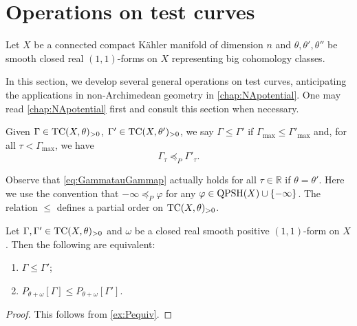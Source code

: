 \section{Operations on test curves}\label{sec:operationtc}
Let $X$ be a connected compact K\"ahler manifold of dimension $n$ and $\theta,\theta',\theta''$ be smooth closed real $(1,1)$-forms on $X$ representing big cohomology classes.

In this section, we develop several general operations on test curves, anticipating the applications in non-Archimedean geometry in \cref{chap:NApotential}. One may read \cref{chap:NApotential} first and consult this section when necessary.

\begin{definition}\label{def:potestcurve}
    Given $\Gamma\in \mathrm{TC}(X,\theta)_{>0}$, $\Gamma'\in \mathrm{TC}(X,\theta')_{>0}$, we say $\Gamma \leq \Gamma'$ if $\Gamma_{\max}\leq \Gamma'_{\max}$ and, for all $\tau<\Gamma_{\max}$, we have
    \begin{equation}\label{eq:GammatauGammap}
    \Gamma_{\tau}\preceq_P \Gamma'_{\tau}.
    \end{equation}
\end{definition}
Observe that \eqref{eq:GammatauGammap} actually holds for all $\tau\in \mathbb{R}$ if $\theta=\theta'$. Here we use the convention that $-\infty \preceq_P \varphi$ for any $\varphi\in \mathrm{QPSH}(X)\cup \{-\infty\}$.
The relation $\leq$ defines a partial order on $\mathrm{TC}(X,\theta)_{>0}$.
\begin{lemma}\label{lma:testcurord1}
    Let $\Gamma,\Gamma'\in \mathrm{TC}(X,\theta)_{>0}$ and $\omega$ be a closed real smooth positive $(1,1)$-form on $X$. Then the following are equivalent:
    \begin{enumerate}
        \item\label{itm:lma:testcurord1:1} $\Gamma\leq \Gamma'$;
        \item\label{itm:lma:testcurord1:2} $P_{\theta+\omega}[\Gamma]\leq P_{\theta+\omega}[\Gamma']$.
    \end{enumerate}
\end{lemma}
\begin{proof}
    This follows from \cref{ex:Pequiv}.
\end{proof}


